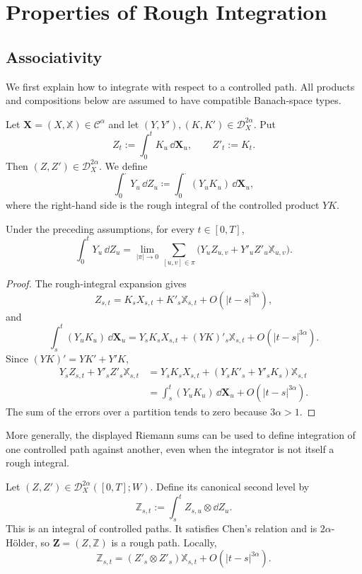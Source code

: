 \chapter{Properties of Rough Integration}

\section{Associativity}

We first explain how to integrate with respect to a controlled path.  All
products and compositions below are assumed to have compatible Banach-space
types.

\begin{de}
Let $\mathbf X=(X,\mathbb X)\in\mathscr C^\alpha$ and let
$(Y,Y'),(K,K')\in\mathscr D_X^{2\alpha}$.  Put
\[
  Z_t:=\int_0^tK_u\,\dd\mathbf X_u,
  \qquad Z'_t:=K_t.
\]
Then $(Z,Z')\in\mathscr D_X^{2\alpha}$.  We define
\[
  \int_0^\cdot Y_u\,\dd Z_u
  \coloneqq \int_0^\cdot (Y_uK_u)\,\dd\mathbf X_u,
\]
where the right-hand side is the rough integral of the controlled product
$YK$.
\end{de}

\begin{prop}
Under the preceding assumptions, for every $t\in[0,T]$,
\[
  \int_0^tY_u\,\dd Z_u
  =\lim_{|\pi|\to0}\sum_{[u,v]\in\pi}
   \bigl(Y_uZ_{u,v}+Y'_uZ'_u\mathbb X_{u,v}\bigr).
\]
\end{prop}

\begin{proof}
The rough-integral expansion gives
\[
  Z_{s,t}=K_sX_{s,t}+K'_s\mathbb X_{s,t}+O(|t-s|^{3\alpha}),
\]
and
\[
  \int_s^t(Y_uK_u)\,\dd\mathbf X_u
  =Y_sK_sX_{s,t}+(YK)'_s\mathbb X_{s,t}+O(|t-s|^{3\alpha}).
\]
Since $(YK)'=YK'+Y'K$,
\begin{align*}
Y_sZ_{s,t}+Y'_sZ'_s\mathbb X_{s,t}
&=Y_sK_sX_{s,t}+(Y_sK'_s+Y'_sK_s)\mathbb X_{s,t}\\
&=\int_s^t(Y_uK_u)\,\dd\mathbf X_u+O(|t-s|^{3\alpha}).
\end{align*}
The sum of the errors over a partition tends to zero because $3\alpha>1$.
\end{proof}

More generally, the displayed Riemann sums can be used to define integration
of one controlled path against another, even when the integrator is not itself
a rough integral.

Let $(Z,Z')\in\mathscr D_X^{2\alpha}([0,T];W)$.  Define its canonical second
level by
\[
  \mathbb Z_{s,t}:=\int_s^t Z_{s,u}\otimes\dd Z_u.
\]
This is an integral of controlled paths.  It satisfies Chen's relation and is
$2\alpha$-Hölder, so $\mathbf Z=(Z,\mathbb Z)$ is a rough path.  Locally,
\[
  \mathbb Z_{s,t}=(Z'_s\otimes Z'_s)\mathbb X_{s,t}
  +O(|t-s|^{3\alpha}).
\]

